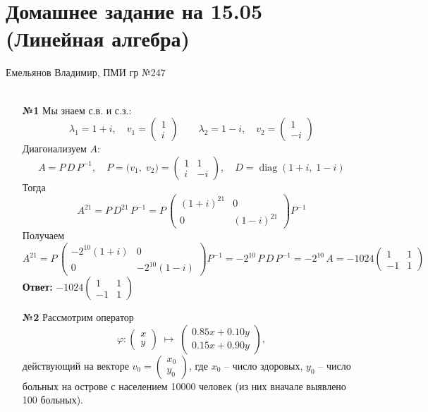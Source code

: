 \documentclass[a4paper]{article}
\renewcommand{\phi}{\varphi}
\begin{document}
\section*{Домашнее задание на 15.05 (Линейная алгебра)}
{\large Емельянов Владимир, ПМИ гр №247}\\\\
\begin{enumerate}
  \item[\textbf{№1}]Мы знаем с.в. и с.з.:
  $$\lambda_1=1+i,\quad v_1=\begin{pmatrix}1\\i\end{pmatrix}
  \qquad
  \lambda_2=1-i,\quad v_2=\begin{pmatrix}1\\-i\end{pmatrix}$$
  Диагонализуем \(A\):
  \[
  A = P\,D\,P^{-1},\quad
  P=\bigl(v_1,\;v_2\bigr)
  =\begin{pmatrix}1&1\\i&-i\end{pmatrix},\quad
  D=\operatorname{diag}(1+i,\;1-i)
  \]
  Тогда
  $$
  A^{21}
  = P\,D^{21}\,P^{-1}
  = P\,\begin{pmatrix}(1+i)^{21}&0\\0&(1-i)^{21}\end{pmatrix}P^{-1}
  $$
  Получаем
  $$
  A^{21}
  = P\,\begin{pmatrix}-2^{10}(1+i)&0\\0&-2^{10}(1-i)\end{pmatrix}P^{-1}
  =-2^{10}\,P\,D\,P^{-1}
  =-2^{10}\,A
  =-1024\begin{pmatrix}1&1\\-1&1\end{pmatrix}
  $$
  \textbf{Ответ: } $-1024\begin{pmatrix}1&1\\-1&1\end{pmatrix}$\\

  \item[\textbf{№2}]Рассмотрим оператор
  $$
  \phi:\begin{pmatrix}x\\y\end{pmatrix}\;\longmapsto\;
  \begin{pmatrix}
  0.85x+0.10y\\[6pt]
  0.15x+0.90y
  \end{pmatrix},
  $$
  действующий на векторе
  $\displaystyle v_0=\begin{pmatrix}x_0\\y_0\end{pmatrix}$,
  где $x_0$ – число здоровых, $y_0$ – число больных на острове с населением 10000 человек (из них вначале выявлено 100 больных).


\end{enumerate}
\end{document}
